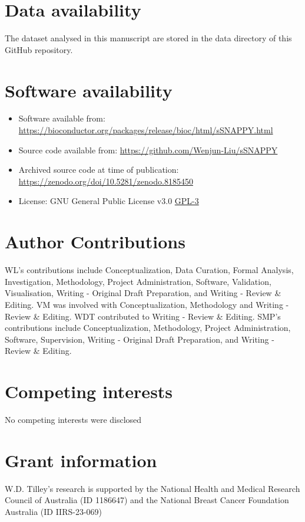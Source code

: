 \documentclass[9pt,a4paper,]{extarticle}
\begin{document}
\hypertarget{data-availability}{%
\section{Data availability}\label{data-availability}}

The dataset analysed in this manuscript are stored in the data directory of this GitHub repository.

\hypertarget{software-availability}{%
\section{Software availability}\label{software-availability}}

\begin{itemize}
\item
  Software available from: \url{https://bioconductor.org/packages/release/bioc/html/sSNAPPY.html}
\item
  Source code available from: \url{https://github.com/Wenjun-Liu/sSNAPPY}
\item
  Archived source code at time of publication: \url{https://zenodo.org/doi/10.5281/zenodo.8185450}
\item
  License: GNU General Public License v3.0 \href{https://opensource.org/license/gpl-3-0/}{GPL-3}
\end{itemize}

\hypertarget{author-contributions}{%
\section{Author Contributions}\label{author-contributions}}

WL's contributions include Conceptualization, Data Curation, Formal Analysis, Investigation, Methodology, Project Administration, Software, Validation, Visualisation, Writing - Original Draft Preparation, and Writing - Review \& Editing.
VM was involved with Conceptualization, Methodology and Writing - Review \& Editing.
WDT contributed to Writing - Review \& Editing.
SMP's contributions include Conceptualization, Methodology, Project Administration, Software, Supervision, Writing - Original Draft Preparation, and Writing - Review \& Editing.

\hypertarget{competing-interests}{%
\section{Competing interests}\label{competing-interests}}

No competing interests were disclosed

\hypertarget{grant-information}{%
\section{Grant information}\label{grant-information}}

W.D. Tilley's research is supported by the National Health and Medical Research Council of Australia (ID 1186647) and the National Breast Cancer Foundation Australia (ID IIRS-23-069)

\renewcommand\refname{References}
{\small}
\end{document}
